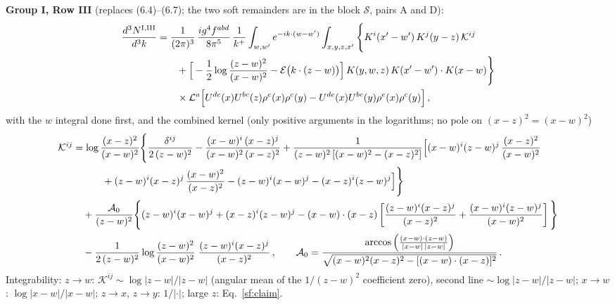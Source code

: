 \documentclass[10pt]{article}
\begin{document}
\noindent\textbf{Group I, Row III} (replaces (6.4)--(6.7); the two soft remainders are in the block $\mathcal{S}$, pairs A and D):
\begin{align}
\frac{d^{3}N^{\rm I,III}}{d^{3}k}&=\frac{1}{(2\pi)^{3}}\,\frac{ig^{4}f^{abd}}{8\pi^{5}}\,\frac{1}{k^{+}}\int_{w,w'}e^{-ik\cdot(w-w')}\int_{x,y,z,x'}\Bigg\{K^{i}(x'-w')\,K^{j}(y-z)\,\mathcal{K}^{ij}\notag\\
&\qquad+\Big[-\frac12\log\frac{(z-w)^{2}}{(x-w)^{2}}-\mathcal{E}\big(k\cdot(z-w)\big)\Big]\,K(y,w,z)\,K(x'-w')\cdot K(x-w)\Bigg\}\notag\\&\qquad\times\mathcal{L}^{a}\Big[U^{de}(x)U^{bc}(z)\rho^{e}(x)\rho^{c}(y)-U^{de}(x)U^{bc}(y)\rho^{e}(x)\rho^{c}(y)\Big]\,,\label{sf:GIIII}
\end{align}
with the $w$ integral done first, and the combined kernel (only positive arguments in the logarithms; no pole on $(x-z)^{2}=(x-w)^{2}$)
\begin{align}
\mathcal{K}^{ij}&=\log\frac{(x-z)^{2}}{(x-w)^{2}}\Bigg\{\frac{\delta^{ij}}{2\,(z-w)^{2}}-\frac{(x-w)^{i}\,(x-z)^{j}}{(x-w)^{2}\,(x-z)^{2}}
+\frac{1}{(z-w)^{2}\left[(x-w)^{2}-(x-z)^{2}\right]}\Big[(x-w)^{i}(z-w)^{j}\,\frac{(x-z)^{2}}{(x-w)^{2}}\notag\\
&\qquad\quad+(z-w)^{i}(x-z)^{j}\,\frac{(x-w)^{2}}{(x-z)^{2}}-(z-w)^{i}(x-w)^{j}-(x-z)^{i}(z-w)^{j}\Big]\Bigg\}\notag\\
&\quad+\frac{\mathcal{A}_{0}}{(z-w)^{2}}\Bigg\{(z-w)^{i}(x-w)^{j}+(x-z)^{i}(z-w)^{j}-(x-w)\cdot(x-z)\left[\frac{(z-w)^{i}(x-z)^{j}}{(x-z)^{2}}+\frac{(x-w)^{i}(z-w)^{j}}{(x-w)^{2}}\right]\Bigg\}\notag\\
&\quad-\frac{1}{2\,(z-w)^{2}}\log\frac{(z-w)^{2}}{(x-w)^{2}}\;\frac{(z-w)^{i}(x-z)^{j}}{(x-z)^{2}}\,,\qquad
\mathcal{A}_{0}=\frac{\arccos\Big(\frac{(x-w)\cdot(z-w)}{|x-w|\,|z-w|}\Big)}{\sqrt{(x-w)^{2}(x-z)^{2}-[(x-w)\cdot(x-z)]^{2}}}\,.\label{sf:Kij}
\end{align}
Integrability: $z\to w$: $\mathcal{K}^{ij}\sim\log|z-w|/|z-w|$ (angular mean of the $1/(z-w)^{2}$ coefficient zero), second line $\sim\log|z-w|/|z-w|$; $x\to w$: $\log|x-w|/|x-w|$; $z\to x$, $z\to y$: $1/|\cdot|$; large $z$: Eq.~\eqref{sf:claim}.
\end{document}
